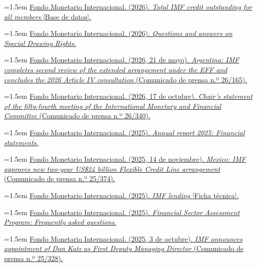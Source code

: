 \documentclass[10pt,a4paper]{article}
\begin{document}
\noindent\hangindent=1.5em \href{https://www.imf.org/external/np/fin/tad/extcred1.aspx}{Fondo Monetario Internacional. (2026). \textit{Total IMF credit outstanding for all members} [Base de datos].}

\noindent\hangindent=1.5em \href{https://www.imf.org/en/About/FAQ/special-drawing-right}{Fondo Monetario Internacional. (2026). \textit{Questions and answers on Special Drawing Rights}.}

\noindent\hangindent=1.5em \href{https://www.imf.org/en/news/articles/2026/05/21/pr26165-argentina-imf-completes-2nd-rev-of-extended-arr-under-eff-concludes-2026-aiv-consultation}{Fondo Monetario Internacional. (2026, 21 de mayo). \textit{Argentina: IMF completes second review of the extended arrangement under the EFF and concludes the 2026 Article IV consultation} (Comunicado de prensa n.º 26/165).}

\noindent\hangindent=1.5em \href{https://www.imf.org/en/news/articles/2026/10/17/pr26340-chairs-statement-fifty-fourth-meeting-of-the-imfc}{Fondo Monetario Internacional. (2026, 17 de octubre). \textit{Chair's statement of the fifty-fourth meeting of the International Monetary and Financial Committee} (Comunicado de prensa n.º 26/340).}

\noindent\hangindent=1.5em \href{https://www.imf.org/external/pubs/ft/ar/2025/pdfs/imf-annual-report-2025-financial-statements.pdf}{Fondo Monetario Internacional. (2025). \textit{Annual report 2025: Financial statements}.}

\noindent\hangindent=1.5em \href{https://www.imf.org/en/news/articles/2025/11/14/pr-25374-mexico-imf-approves-new-2-year-us-24-billion-flexible-credit-line-arrangement}{Fondo Monetario Internacional. (2025, 14 de noviembre). \textit{Mexico: IMF approves new two-year US\$24 billion Flexible Credit Line arrangement} (Comunicado de prensa n.º 25/374).}

\noindent\hangindent=1.5em \href{https://www.imf.org/en/About/Factsheets/IMF-Lending}{Fondo Monetario Internacional. (2025). \textit{IMF lending} [Ficha técnica].}

\noindent\hangindent=1.5em \href{https://www.imf.org/en/Publications/fssa/financial-sector-assessment-program-faq}{Fondo Monetario Internacional. (2025). \textit{Financial Sector Assessment Program: Frequently asked questions}.}

\noindent\hangindent=1.5em \href{https://www.imf.org/en/News/Articles/2025/10/03/pr25328-imf-announces-appointment-of-dan-katz-as-first-deputy-managing-director}{Fondo Monetario Internacional. (2025, 3 de octubre). \textit{IMF announces appointment of Dan Katz as First Deputy Managing Director} (Comunicado de prensa n.º 25/328).}
\end{document}
